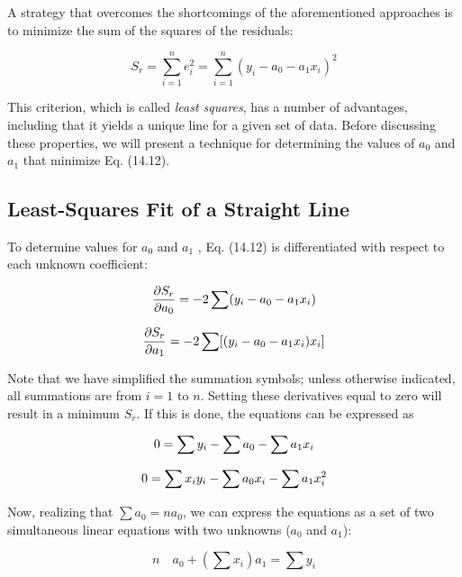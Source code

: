 \documentclass[../main.tex]{subfiles}
\begin{document}
A strategy that overcomes the shortcomings of the aforementioned approaches is to
minimize the sum of the squares of the residuals:

\begin{equation}
	\tag{14.12}
	S_r = \sum_{i=1}^n e_i^2 = \sum^n_{i=1} (y_i - a_0 - a_1 x_i)^2
\end{equation}

\noindent This criterion, which is called \textit{least squares}, has a number of advantages, including that it
yields a unique line for a given set of data. Before discussing these properties, we will present a technique for determining the values of $a_0$ and $a_1$ that minimize Eq. (14.12).

\label{cha:cha_P_14_3_2}
\subsection{Least-Squares Fit of a Straight Line}

\noindent To determine values for $a_0$ and $a_1$ , Eq. (14.12) is differentiated with respect to each
unknown coefficient:

\begin{equation}
	\notag
	\frac{\partial S_r}{\partial a_0} = -2 \sum (y_i - a_0 - a_1 x_i)
\end{equation}

\begin{equation}
	\notag
	\frac{\partial S_r}{\partial a_1} = -2 \sum [(y_i - a_0 - a_1 x_i) x_i]
\end{equation}

\noindent Note that we have simplified the summation symbols; unless otherwise indicated, all summations are from $i = 1$ to $n$. Setting these derivatives equal to zero will result in a minimum
$S_r$. If this is done, the equations can be expressed as

\begin{equation}
	\notag
	0 = \sum y_i - \sum a_0 - \sum a_1 x_i
\end{equation}

\begin{equation}
	\notag
	0 = \sum x_i y_i - \sum a_0 x_i - \sum a_1 x_i^2
\end{equation}

\noindent Now, realizing that $\sum a_0 = na_0$, we can express the equations as a set of two simultaneous
linear equations with two unknowns ($a_0$ and $a_1$):

\begin{equation}
	\tag{14.13}
	n \quad a_0 + \left( \sum x_i \right) a_1 = \sum y_i
\end{equation}
\end{document}
